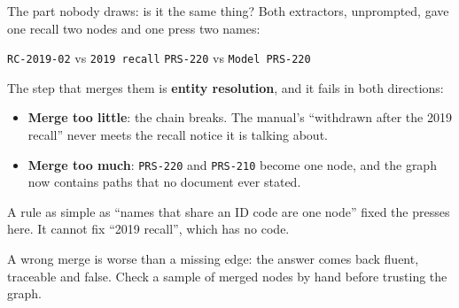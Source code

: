 \documentclass[aspectratio=169]{beamer}
\newcommand{\trapbox}[1]{%
  \begin{tcolorbox}[colback=armred!8, colframe=armred, boxrule=0.6pt, arc=2pt]
  #1
  \end{tcolorbox}}
\begin{document}
\begin{frame}{The part nobody draws: is it the same thing?}
  \vspace{0.2em}
  Both extractors, unprompted, gave one recall two nodes and one press two names:

  \vspace{0.3em}
  \begin{center}
  \small
  \texttt{RC-2019-02} \enspace vs \enspace \texttt{2019 recall} \qquad\qquad
  \texttt{PRS-220} \enspace vs \enspace \texttt{Model PRS-220}
  \end{center}

  \vspace{0.3em}
  The step that merges them is \textbf{entity resolution}, and it fails in both directions:

  \vspace{0.2em}
  \begin{itemize}
    \item \textbf{Merge too little}: the chain breaks. The manual's ``withdrawn after the 2019
      recall'' never meets the recall notice it is talking about.
    \item \textbf{Merge too much}: \texttt{PRS-220} and \texttt{PRS-210} become one node, and the
      graph now contains paths that no document ever stated.
  \end{itemize}

  \vspace{0.1em}
  {\small A rule as simple as ``names that share an ID code are one node'' fixed the presses here.
  It cannot fix ``2019 recall'', which has no code.}

  \vspace{0.1em}
  \trapbox{\small A wrong merge is worse than a missing edge: the answer comes back fluent,
  traceable and false. Check a sample of merged nodes by hand before trusting the graph.}
\end{frame}
\end{document}
